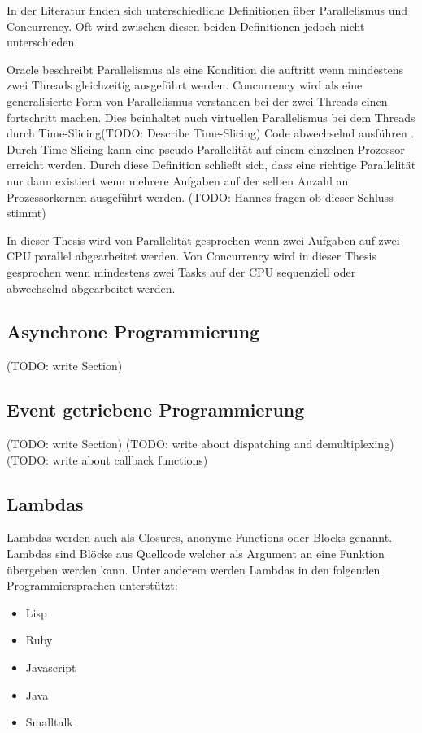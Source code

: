 In der Literatur finden sich unterschiedliche Definitionen über Parallelismus und Concurrency. Oft wird zwischen diesen beiden Definitionen jedoch nicht unterschieden.

Oracle beschreibt Parallelismus als eine Kondition die auftritt wenn mindestens zwei Threads gleichzeitig ausgeführt werden. Concurrency wird als eine generalisierte Form von Parallelismus verstanden bei der zwei Threads einen fortschritt machen. Dies beinhaltet auch virtuellen Parallelismus bei dem Threads durch Time-Slicing(TODO: Describe Time-Slicing) Code abwechselnd ausführen \cite[]{oracle:multithreading}. Durch Time-Slicing kann eine pseudo Parallelität auf einem einzelnen Prozessor erreicht werden. Durch diese Definition schließt sich, dass eine richtige Parallelität nur dann existiert wenn mehrere Aufgaben auf der selben Anzahl an Prozessorkernen ausgeführt werden. (TODO: Hannes fragen ob dieser Schluss stimmt)

In dieser Thesis wird von Parallelität gesprochen wenn zwei Aufgaben auf zwei CPU parallel abgearbeitet werden. Von Concurrency wird in dieser Thesis gesprochen wenn mindestens zwei Tasks auf der CPU sequenziell oder abwechselnd abgearbeitet werden.


\subsection{Asynchrone Programmierung}
(TODO: write Section)

\subsection{Event getriebene Programmierung}
(TODO: write Section)
(TODO: write about dispatching and demultiplexing)
(TODO: write about callback functions)

\subsection{Lambdas}
Lambdas werden auch als Closures, anonyme Functions oder Blocks genannt. Lambdas sind Blöcke aus Quellcode welcher als Argument an eine Funktion übergeben werden kann. Unter anderem werden Lambdas in den folgenden Programmiersprachen unterstützt:

\begin{itemize}
  \item Lisp
  \item Ruby
  \item Javascript
  \item Java
  \item Smalltalk
\end{itemize}

